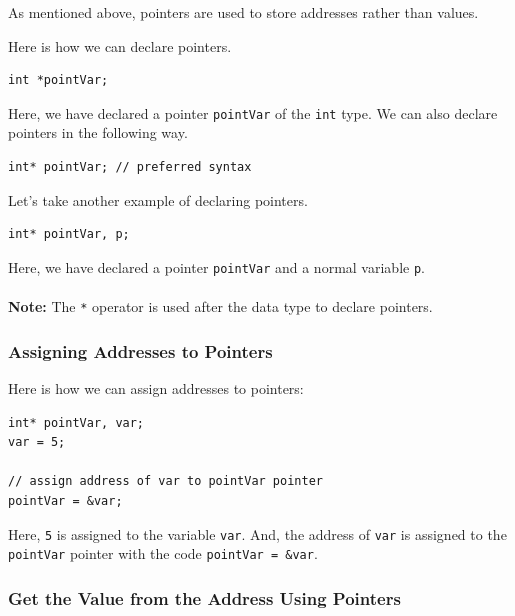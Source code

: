 As mentioned above, pointers are used to store addresses rather than
values.

Here is how we can declare pointers.

\begin{verbatim}
int *pointVar;
\end{verbatim}

Here, we have declared a pointer \texttt{pointVar} of the \texttt{int} type. We can also declare pointers in the following way.

\begin{verbatim}
int* pointVar; // preferred syntax
\end{verbatim}

Let's take another example of declaring pointers.

\begin{verbatim}
int* pointVar, p;
\end{verbatim}

Here, we have declared a pointer \texttt{pointVar} and a normal variable
\texttt{p}.\\
~\\
\textbf{Note:} The \texttt{*} operator is used after the data type to declare pointers.

\doublelinewithspace{.0cm}

\hypertarget{assign}{%
\subsubsection{Assigning Addresses to Pointers}\label{assign}}

Here is how we can assign addresses to pointers:

\begin{verbatim}
int* pointVar, var;
var = 5;

// assign address of var to pointVar pointer
pointVar = &var;
\end{verbatim}

Here, \texttt{5} is assigned to the variable \texttt{var}. And, the
address of \texttt{var} is assigned to the \texttt{pointVar} pointer
with the code \texttt{pointVar\ =\ \&var}.

\doublelinewithspace{.0cm}

\hypertarget{get-value}{%
\subsubsection{Get the Value from the Address Using
Pointers}\label{get-value}}

